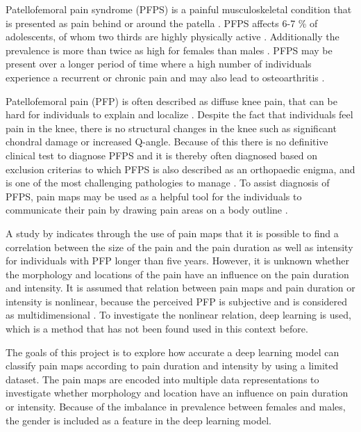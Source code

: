Patellofemoral pain syndrome (PFPS) is a painful musculoskeletal condition that is presented as pain behind or around the patella \citep{Maclachlan2017, Smith2015}. PFPS affects 6-7 \% of adolescents, of whom two thirds are highly physically active \citep{Rathleff2015}. Additionally the prevalence is more than twice as high for females than males \citep{Rathleff2015, Petersen2013}.
PFPS may be present over a longer period of time where a high number of individuals experience a recurrent or chronic pain \citep{Witvrouw2014} and may also lead to osteoarthritis \citep{Petersen2013, Crossley2016}.

\noindent
Patellofemoral pain (PFP) is often described as diffuse knee pain, that can be hard for individuals to explain and localize \citep{Witvrouw2014}. Despite the fact that individuals feel pain in the knee, there is no structural changes in the knee such as significant chondral damage or increased Q-angle. Because of this there is no definitive clinical test to diagnose PFPS and it is thereby often diagnosed based on exclusion criterias \citep{Petersen2013} to which PFPS is also described as an orthopaedic enigma, and is one of the most challenging pathologies to manage \citep{Dye2001}.
To assist diagnosis of PFPS, pain maps may be used as a helpful tool for the individuals to communicate their pain by drawing pain areas on a body outline \citep{Boudreau2016}. 

\noindent
A study by \citeauthor{Boudreau2017} indicates through the use of pain maps that it is possible to find a correlation between the size of the pain and the pain duration as well as intensity for individuals with PFP longer than five years.\citep{Boudreau2017} However, it is unknown whether the morphology and locations of the pain have an influence on the pain duration and intensity. 
It is assumed that relation between pain maps and pain duration or intensity is nonlinear, because the perceived PFP is subjective and is considered as multidimensional \citep{Dansie2013}. To investigate the nonlinear relation, deep learning is used, which is a method that has not been found used in this context before.

\noindent
The goals of this project is to explore how accurate a deep learning model can classify pain maps according to pain duration and intensity by using a limited dataset. The pain maps are encoded into multiple data representations to investigate whether morphology and location have an influence on pain duration or intensity. Because of the imbalance in prevalence between females and males, the gender is included as a feature in the deep learning model. \newline

